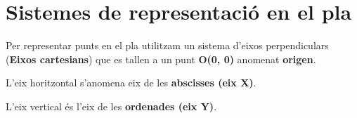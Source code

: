 
\section{Sistemes de representació en el pla}

\begin{theorybox}

 Per representar punts en el pla utilitzam un sistema d'eixos perpendiculars (\textbf{Eixos cartesians}) que es tallen a un punt \textbf{O(0, 0)} anomenat \textbf{origen}. 
 
 L'eix horitzontal s'anomena eix de les \textbf{abscisses (eix X)}.
 	
 L'eix vertical és l'eix de les \textbf{ordenades (eix Y)}.
\end{theorybox}

